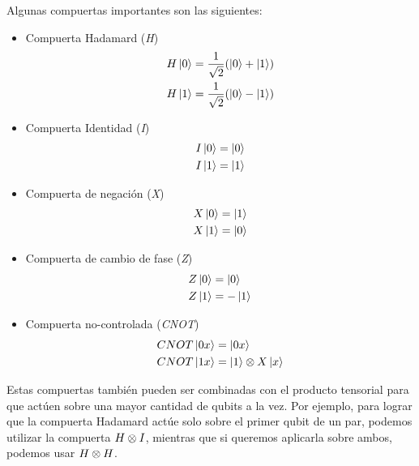 Algunas compuertas importantes son las siguientes:
\begin{itemize}
  \item Compuerta Hadamard (\textit{H})
  \begin{equation*}
    \begin{split}
      H \ket{0} & = \frac{1}{\sqrt{2}} (\ket{0} + \ket{1}) \\
      H \ket{1} & = \frac{1}{\sqrt{2}} (\ket{0} - \ket{1})
    \end{split}
  \end{equation*}

  \item Compuerta Identidad (\textit{I})
  \begin{equation*}
    \begin{split}
      I \ket{0} & = \ket{0} \\
      I \ket{1} & = \ket{1}
    \end{split}
  \end{equation*}

  \item Compuerta de negación (\textit{X})
  \begin{equation*}
    \begin{split}
      X \ket{0} & = \ket{1} \\
      X \ket{1} & = \ket{0}
    \end{split}
  \end{equation*}

  \item Compuerta de cambio de fase (\textit{Z})
  \begin{equation*}
    \begin{split}
      Z \ket{0} & = \ket{0} \\
      Z \ket{1} & = - \ket{1}
    \end{split}
  \end{equation*}

  \item Compuerta no-controlada (\textit{CNOT})
  \begin{equation*}
    \begin{split}
      CNOT \ket{0x} & = \ket{0x} \\
      CNOT \ket{1x} & = \ket{1} \otimes X \ket{x}
    \end{split}
  \end{equation*}
\end{itemize}

Estas compuertas también pueden ser combinadas con el producto tensorial para que actúen sobre una mayor cantidad de qubits a la vez. Por ejemplo, para lograr que la compuerta Hadamard actúe solo sobre el primer qubit de un par, podemos utilizar la compuerta \( H \otimes I \), mientras que si queremos aplicarla sobre ambos, podemos usar \( H \otimes H \).

